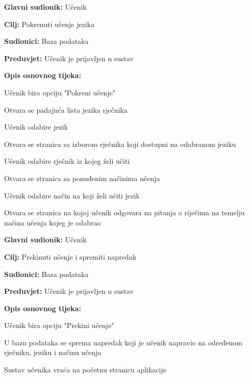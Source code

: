 					\noindent {}
					\begin{packed_item}
	
						\item \textbf{Glavni sudionik: }Učenik
						\item  \textbf{Cilj:} Pokrenuti učenje jezika
						\item  \textbf{Sudionici:} Baza podataka
						\item  \textbf{Preduvjet:} Učenik je prijavljen u sustav
						\item  \textbf{Opis osnovnog tijeka:}
						
						\item[] \begin{packed_enum}
	
							\item Učenik bira opciju "Pokreni učenje"
							\item Otvara se padajuća lista jezika rječnika
							\item Učenik odabire jezik
							\item Otvara se stranica sa izborom rječnika koji dostupni na odabranom jeziku
							\item Učenik odabire rječnik iz kojeg želi učiti
							\item Otvara se stranica sa ponuđenim načinima učenja
							\item Učenik odabire način na koji želi učiti jezik
							\item Otvara se stranica na kojoj učenik odgovara na pitanja o riječima na temelju načina učenja kojeg je odabrao
						\end{packed_enum}
						
					\end{packed_item}

					\noindent \underbar{\textbf{UC8 - Prekid učenja}}
					\begin{packed_item}
	
						\item \textbf{Glavni sudionik: }Učenik
						\item  \textbf{Cilj:} Prekinuti učenje i spremiti napredak
						\item  \textbf{Sudionici:} Baza podataka
						\item  \textbf{Preduvjet:} Učenik je prijavljen u sustav
						\item  \textbf{Opis osnovnog tijeka:}
						
						\item[] \begin{packed_enum}
	
							\item Učenik bira opciju "Prekini učenje"
							\item U bazu podataka se sprema napredak koji je učenik napravio na određenom rječniku, jeziku i načinu učenja
							\item Sustav učenika vraća na početnu stranicu aplikacije
						\end{packed_enum}
						
					\end{packed_item}


